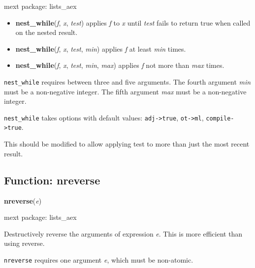 \documentclass[]{article}
\begin{document}
\noindent mext package: lists\_aex



\vspace{5 pt}
\begin{itemize}
\item[] {\bf nest\_while}({\it f}, {\it x}, {\it test})
  applies {\it f} to {\it x} until {\it test} fails to return true when called on the nested result. 

\item[] {\bf nest\_while}({\it f}, {\it x}, {\it test}, {\it min})
  applies {\it f} at least {\it min} times. 

\item[] {\bf nest\_while}({\it f}, {\it x}, {\it test}, {\it min}, {\it max})
  applies {\it f} not more than {\it max} times. 

\end{itemize}
   {\tt nest\_while} requires between three and five arguments.
    The fourth argument {\it min} must be a non-negative integer.
    The fifth argument {\it max} must be a non-negative integer.


\vspace{5 pt}

{\tt nest\_while} takes options with default values: {\tt adj->true}, {\tt ot->ml}, {\tt compile->true}.
\vspace{5 pt}


This should be modified to allow applying test to more than just the most recent result. 

\vspace{5 pt}


\subsection{Function: nreverse\label{sec:nreverse}}
\hypertarget{nreverse}{}
{\bf nreverse}({\it e})


\noindent mext package: lists\_aex



\vspace{5 pt}
Destructively reverse the arguments of expression {\it e}. This is more efficient than using reverse. 

\vspace{5 pt}

   {\tt nreverse} requires one argument {\it e}, which must be non-atomic.
\end{document}
